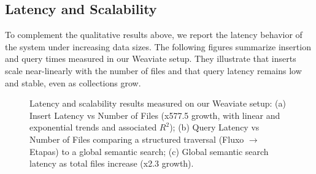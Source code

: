 \subsection{Latency and Scalability}
To complement the qualitative results above, we report the latency behavior of the system under increasing data sizes. The following figures summarize insertion and query times measured in our Weaviate setup. They illustrate that inserts scale near-linearly with the number of files and that query latency remains low and stable, even as collections grow.

\begin{figure}[htbp]
    \centering
    \hfill
    \hfill
    \caption{Latency and scalability results measured on our Weaviate setup: (a) Insert Latency vs Number of Files (x577.5 growth, with linear and exponential trends and associated $R^2$); (b) Query Latency vs Number of Files comparing a structured traversal (Fluxo $\rightarrow$ Etapas) to a global semantic search; (c) Global semantic search latency as total files increase (x2.3 growth).}
\end{figure}

